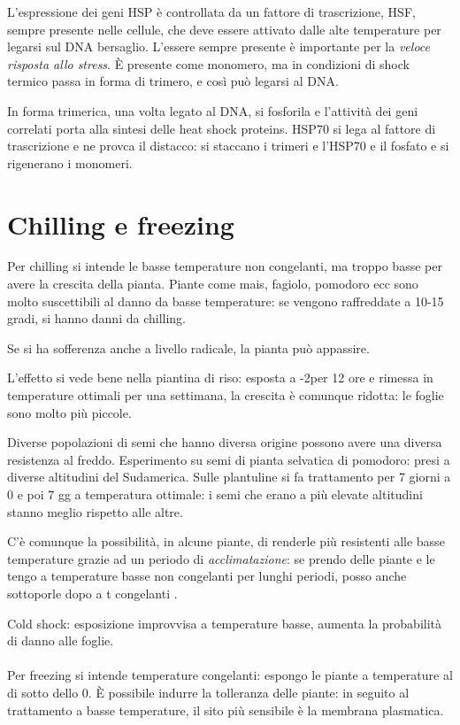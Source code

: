 \documentclass[a4paper,12pt]{book}
\begin{document}
 L'espressione dei geni HSP è controllata da un fattore di trascrizione, HSF, sempre presente nelle cellule, che deve essere attivato dalle alte temperature per legarsi sul DNA bersaglio. L'essere sempre presente è importante per la \emph{veloce risposta allo stress}. È presente come monomero, ma in condizioni di shock termico passa in forma di trimero, e così può legarsi al DNA.
 
In forma trimerica, una volta legato al DNA, si fosforila e l'attività dei geni correlati porta alla sintesi delle heat shock proteins. HSP70 si lega al fattore di trascrizione e ne provca il distacco: si staccano i trimeri e l'HSP70 e il fosfato e si rigenerano i monomeri. 

\section{Chilling e freezing}
Per chilling  si intende le basse temperature non congelanti, ma troppo basse per avere la crescita della pianta.
Piante come mais, fagiolo, pomodoro ecc sono molto suscettibili al danno da basse temperature: se vengono raffreddate a 10-15 gradi, si hanno danni da chilling.

Se si ha sofferenza anche a livello radicale, la pianta può appassire.

L'effetto si vede bene nella piantina di riso: esposta a -2\textcelsius per 12 ore e rimessa in temperature ottimali per una settimana, la crescita è comunque ridotta: le foglie sono molto più piccole. 

Diverse popolazioni di semi che hanno diversa origine possono avere una diversa resistenza al freddo. Esperimento su semi di pianta selvatica di pomodoro: presi a diverse altitudini del Sudamerica. Sulle plantuline si fa trattamento per 7 giorni a 0 \textcelsius e poi 7 gg a temperatura ottimale: i semi che erano a più elevate altitudini stanno meglio rispetto alle altre.

C'è comunque la possibilità, in alcune piante, di renderle più resistenti alle basse temperature grazie ad un periodo di \emph{acclimatazione}: se prendo delle piante e le tengo a temperature basse non congelanti per lunghi periodi, posso anche sottoporle dopo a t congelanti .

Cold shock: esposizione improvvisa a temperature basse, aumenta la probabilità di danno alle foglie.
\paragraph{}
Per freezing si intende temperature congelanti: espongo le piante a temperature al di sotto dello 0. È possibile indurre la tolleranza delle piante: in seguito al trattamento a basse temperature, il sito più sensibile è la membrana plasmatica.
\end{document}
